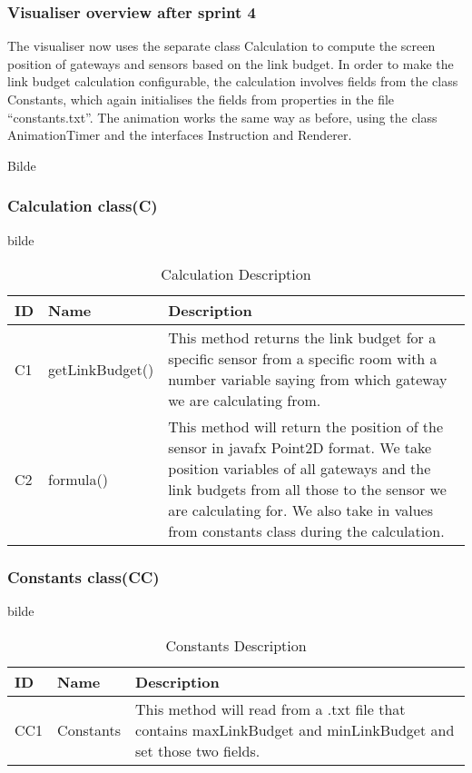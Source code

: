 \documentclass[../document]{subfiles}
\begin{document}
\subsubsection{Visualiser overview after sprint 4}

The visualiser now uses the separate class Calculation to compute the screen position of gateways and sensors based on the link budget. In order to make the link budget calculation configurable, the calculation involves fields from the class Constants, which again initialises the fields from properties in the file “constants.txt”. The animation works the same way as before, using the class AnimationTimer and the interfaces Instruction and Renderer.

Bilde

\subsubsection{Calculation class(C)}

bilde

\begin{table}[H]
\caption{Calculation Description}
\centering
\begin{tabularx}{\textwidth}{|l|l|X|}
\hline ID
&Name
&Description
\\ \hline C1
&getLinkBudget()
&This method returns the link budget for a specific sensor from a specific room with a number variable saying from which gateway we are calculating from.
\\ \hline C2
&formula()
&This method will return the position of the sensor in javafx Point2D format. We take position variables of all gateways and the link budgets from all those to the sensor we are calculating for. We also take in values from constants class during the calculation.
\\ \hline 
\end{tabularx}
\end{table}

\subsubsection{Constants class(CC)}

bilde

\begin{table}[H]
\caption{Constants Description}
\centering
\begin{tabularx}{\textwidth}{|l|l|X|}
\hline ID
&Name
&Description
\\ \hline 
CC1
&Constants
&This method will read from a .txt file that contains maxLinkBudget and minLinkBudget and set those two fields.
\\ \hline 
\end{tabularx}
\end{table}
\end{document}

